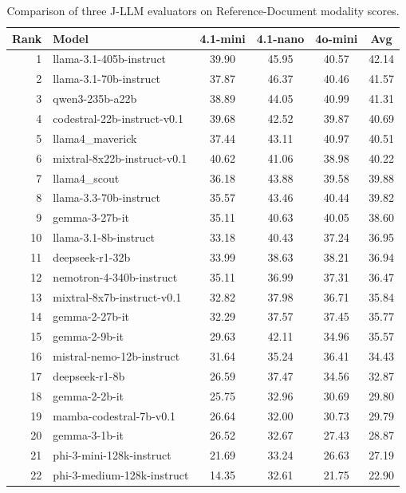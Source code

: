 \begin{table}[htbp]
    \centering
    \begin{tabular}{rlcccc}
    \toprule
    \textbf{Rank} & \textbf{Model} & \textbf{4.1-mini} & \textbf{4.1-nano} & \textbf{4o-mini} & \textbf{Avg} \\
    \midrule
    1 & llama-3.1-405b-instruct & 39.90 & 45.95 & 40.57 & 42.14 \\
    2 & llama-3.1-70b-instruct & 37.87 & 46.37 & 40.46 & 41.57 \\
    3 & qwen3-235b-a22b & 38.89 & 44.05 & 40.99 & 41.31 \\
    4 & codestral-22b-instruct-v0.1 & 39.68 & 42.52 & 39.87 & 40.69 \\
    5 & llama4_maverick & 37.44 & 43.11 & 40.97 & 40.51 \\
    6 & mixtral-8x22b-instruct-v0.1 & 40.62 & 41.06 & 38.98 & 40.22 \\
    7 & llama4_scout & 36.18 & 43.88 & 39.58 & 39.88 \\
    8 & llama-3.3-70b-instruct & 35.57 & 43.46 & 40.44 & 39.82 \\
    9 & gemma-3-27b-it & 35.11 & 40.63 & 40.05 & 38.60 \\
    10 & llama-3.1-8b-instruct & 33.18 & 40.43 & 37.24 & 36.95 \\
    11 & deepseek-r1-32b & 33.99 & 38.63 & 38.21 & 36.94 \\
    12 & nemotron-4-340b-instruct & 35.11 & 36.99 & 37.31 & 36.47 \\
    13 & mixtral-8x7b-instruct-v0.1 & 32.82 & 37.98 & 36.71 & 35.84 \\
    14 & gemma-2-27b-it & 32.29 & 37.57 & 37.45 & 35.77 \\
    15 & gemma-2-9b-it & 29.63 & 42.11 & 34.96 & 35.57 \\
    16 & mistral-nemo-12b-instruct & 31.64 & 35.24 & 36.41 & 34.43 \\
    17 & deepseek-r1-8b & 26.59 & 37.47 & 34.56 & 32.87 \\
    18 & gemma-2-2b-it & 25.75 & 32.96 & 30.69 & 29.80 \\
    19 & mamba-codestral-7b-v0.1 & 26.64 & 32.00 & 30.73 & 29.79 \\
    20 & gemma-3-1b-it & 26.52 & 32.67 & 27.43 & 28.87 \\
    21 & phi-3-mini-128k-instruct & 21.69 & 33.24 & 26.63 & 27.19 \\
    22 & phi-3-medium-128k-instruct & 14.35 & 32.61 & 21.75 & 22.90 \\
    \bottomrule
    \end{tabular}
    \caption{Comparison of three J-LLM evaluators on Reference-Document modality scores.}
    \label{tab:jllm_ref_doc_comparison}
\end{table}
